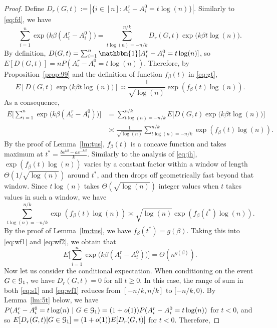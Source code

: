 \documentclass{article}
\begin{document}
\begin{proof}
Define $D_r(G,t):=|\{i\in[n]:A^r_i-A^0_i= t\log(n)\}|$.
Similarly to \eqref{eq:fd}, we have
\begin{equation} \label{eq:s1}
\sum_{i=1}^n \exp\big(k\beta (A^r_i-A^0_i) \big) 
=  \sum_{t\log(n)=-n/k}^{n/k}
D_r(G,t) \exp\big(k\beta t \log(n) \big) .
\end{equation}
By definition, $D(G,t)=\sum_{i=1}^n \mathbbm{1}[A^r_i-A^0_i= t\log(n)]$, so
$E[D(G,t)]=n P(A^r_i-A^0_i= t\log(n))$. Therefore, by Proposition~\ref{prop:99} and the definition of function $f_{\beta}(t)$ in \eqref{eq:gt},
$$
E[D(G,t)
\exp\big(k\beta t \log(n) \big)]
\asymp \frac{1} {\sqrt{\log(n)}} \exp( f_{\beta}(t) \log(n) ) .
$$
As a consequence,
\begin{equation}  \label{eq:wf1}
\begin{aligned}
E \Big[ \sum_{i=1}^n  \exp\big(k\beta (A^r_i-A^0_i) \big) \Big]     
& =  \sum_{t\log(n)=-n/k}^{n/k}
E \big[ D(G,t) \exp\big(k\beta t \log(n) \big) \big]  \\
& \asymp  \frac{1} {\sqrt{\log(n)}} \sum_{t\log(n)=-n/k}^{n/k}
 \exp( f_{\beta}(t) \log(n) ) .
\end{aligned}
\end{equation}
By the proof of Lemma~\ref{lm:tus}, $f_{\beta}(t)$ is a concave function and takes maximum at
$t^\ast=\frac{b e^{k\beta}-a e^{-k\beta}}{k}$. 
Similarly to the analysis of \eqref{eq:jh}, $\exp( f_{\beta}(t) \log(n))$ varies by a constant factor within a window of length $\Theta(1/\sqrt{\log(n)})$ around $t^\ast$, and
then drops off geometrically fast beyond that window. Since $t\log(n)$ takes $\Theta(\sqrt{\log(n)})$ integer values when $t$ takes values in such a window, we have
\begin{equation} \label{eq:wf2}
\sum_{t\log(n)=-n/k}^{n/k}
 \exp( f_{\beta}(t) \log(n) )
 \asymp \sqrt{\log(n)}
 \exp( f_{\beta}(t^\ast) \log(n) ) .
\end{equation}
By the proof of Lemma~\ref{lm:tus}, we have $f_{\beta}(t^\ast)=g(\beta)$. Taking this into \eqref{eq:wf1} and \eqref{eq:wf2}, we obtain that
$$
E \Big[ \sum_{i=1}^n  \exp\big(k\beta (A^r_i-A^0_i) \big) \Big]
= \Theta (n^{g(\beta)}) .
$$
Now let us consider the conditional expectation. When conditioning on the event $G\in\mathcal{G}_1$, we have $D_r(G,t)=0$ for all $t\ge 0$.
In this case, the range of sum in both \eqref{eq:s1} and \eqref{eq:wf1} reduces from $[-n/k,n/k]$ to
$[-n/k,0)$. By Lemma~\ref{lm:5t} below, we have $P(A^r_i-A^0_i= t\log(n)~|~G\in\mathcal{G}_1)= (1+o(1))P(A^r_i-A^0_i= t\log(n))$ for $t<0$, and so
$E[D_r(G,t)|G\in\mathcal{G}_1]=(1+o(1))E[D_r(G,t)]$ for $t<0$. Therefore,

\end{proof}
\end{document}
